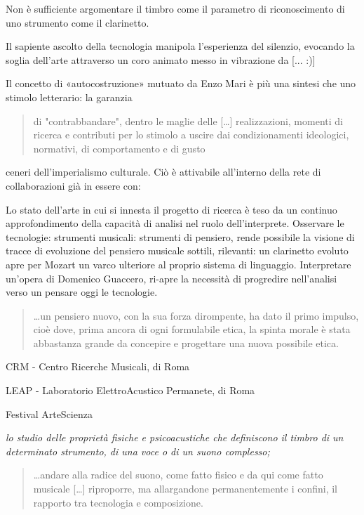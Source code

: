 \documentclass{gs-adonis}
\begin{document}
Non è sufficiente argomentare il timbro come il parametro di riconoscimento di
uno strumento come il clarinetto.

Il sapiente ascolto della tecnologia manipola l'esperienza del silenzio,
evocando la soglia dell'arte attraverso un coro animato messo in vibrazione da
[... :)]

Il concetto di «autocostruzione» mutuato da Enzo Mari \cite{mari2002} è più una
sintesi che uno stimolo letterario: la garanzia

\begin{quote}
  di "contrabbandare", dentro le maglie delle […] realizzazioni, momenti di
  ricerca e contributi per lo stimolo a uscire dai condizionamenti ideologici,
  normativi, di comportamento e di gusto
\end{quote}

ceneri dell'imperialismo culturale. Ciò è attivabile all'interno della rete di
collaborazioni già in essere con:

Lo stato dell'arte in cui si innesta il progetto di ricerca è teso da un continuo
approfondimento della capacità di analisi nel ruolo dell'interprete.
Osservare le tecnologie: strumenti musicali: strumenti di pensiero, rende possibile
la visione di tracce di evoluzione del pensiero musicale sottili, rilevanti:
un clarinetto evoluto apre per Mozart un varco ulteriore al proprio
sistema di linguaggio.
Interpretare un'opera di Domenico Guaccero, ri-apre la necessità di progredire
nell'analisi verso un pensare oggi le tecnologie.

\begin{quote}
  \ldots un pensiero nuovo, con la sua forza dirompente, ha dato il primo impulso,
  cioè dove, prima ancora di ogni formulabile etica, la spinta morale è stata
  abbastanza grande da concepire e progettare una nuova possibile etica.
\end{quote}

CRM - Centro Ricerche Musicali, di Roma

LEAP - Laboratorio ElettroAcustico Permanete, di Roma

Festival ArteScienza

\emph{lo studio delle proprietà fisiche e psicoacustiche che definiscono il timbro di un determinato strumento, di una voce o di un suono complesso;}

\begin{quote}
  …andare alla radice del suono, come fatto fisico e da qui come fatto musicale […] riproporre, ma allargandone permanentemente i confini, il rapporto tra tecnologia e composizione.
\end{quote}
\end{document}
